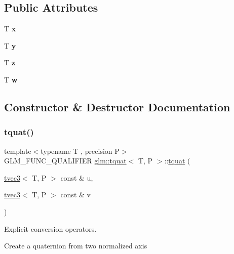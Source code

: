 \subsection*{Public Attributes}
\begin{DoxyCompactItemize}
\item 
\mbox{\label{structglm_1_1tquat_a4e7a21e85428fa8d10e613f109185f28}} 
T {\bfseries x}
\item 
\mbox{\label{structglm_1_1tquat_a06d5c5fb3b08ec993fb4dd74b22fc011}} 
T {\bfseries y}
\item 
\mbox{\label{structglm_1_1tquat_a1b28678ac0e0b3ac2537059754df9fdf}} 
T {\bfseries z}
\item 
\mbox{\label{structglm_1_1tquat_a91055a4c17113bd3f357ffd8595d8ac0}} 
T {\bfseries w}
\end{DoxyCompactItemize}


\subsection{Constructor \& Destructor Documentation}
\mbox{\label{structglm_1_1tquat_a5c680cd9a6e7de9e5b0fc2e9e096e6a7}} 
\subsubsection{\texorpdfstring{tquat()}{tquat()}}
{\footnotesize\ttfamily template$<$typename T , precision P$>$ \\
G\+L\+M\+\_\+\+F\+U\+N\+C\+\_\+\+Q\+U\+A\+L\+I\+F\+I\+ER \hyperlink{structglm_1_1tquat}{glm\+::tquat}$<$ T, P $>$\+::\hyperlink{structglm_1_1tquat}{tquat} (\begin{DoxyParamCaption}\item[{\hyperlink{structglm_1_1tvec3}{tvec3}$<$ T, P $>$ const \&}]{u,  }\item[{\hyperlink{structglm_1_1tvec3}{tvec3}$<$ T, P $>$ const \&}]{v }\end{DoxyParamCaption})}



Explicit conversion operators. 

Create a quaternion from two normalized axis


